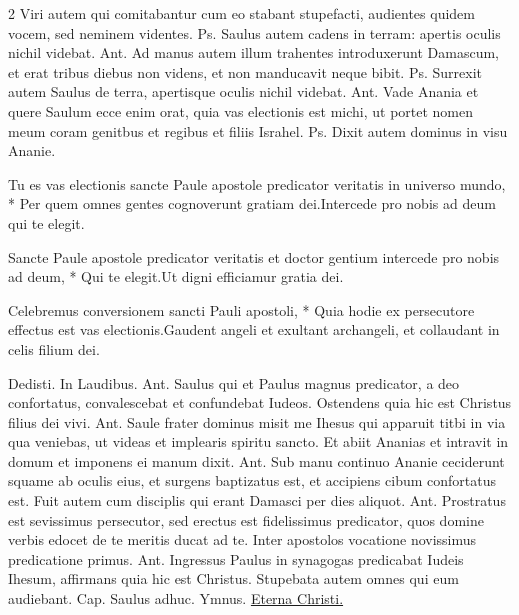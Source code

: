 \begin{multicols*}{2}
 Viri autem qui comitabantur cum eo stabant stupefacti, audientes quidem vocem, sed neminem videntes. {\color{Red} Ps.}  \V Saulus autem cadens in terram: apertis oculis nichil videbat. {\color{Red} Ant.} Ad manus autem illum trahentes introduxerunt Damascum, et erat tribus diebus non videns, et non manducavit neque bibit. {\color{Red} Ps.}  \V Surrexit autem Saulus de terra, apertisque oculis nichil videbat. {\color{Red} Ant.} Vade Anania et quere Saulum ecce enim orat, quia vas electionis est michi, ut portet nomen meum coram genitbus et regibus et filiis Israhel. {\color{Red} Ps.}  \V Dixit autem dominus in visu Ananie.
\begin{responsory}[tu-es-vas]
{Tu es vas electionis sancte Paule apostole predicator veritatis in universo mundo, * Per quem omnes gentes cognoverunt gratiam dei.}{Intercede pro nobis ad deum qui te elegit.}
\end{responsory}%
\begin{responsory}
{Sancte Paule apostole predicator veritatis et doctor gentium intercede pro nobis ad deum, * Qui te elegit.}{Ut digni efficiamur gratia dei.}
\end{responsory}%
\begin{responsory-doxology}
{Celebremus conversionem sancti Pauli apostoli, * Quia hodie ex persecutore effectus est vas electionis.}{Gaudent angeli et exultant archangeli, et collaudant in celis filium dei.}
\end{responsory-doxology}%
\newline \V Dedisti. {\color{Red} In Laudibus. Ant.} Saulus qui et Paulus magnus predicator, a deo confortatus, convalescebat et confundebat Iudeos. \V Ostendens quia hic est Christus filius dei vivi. {\color{Red} Ant.} Saule frater dominus misit me Ihesus qui apparuit titbi in via qua veniebas, ut videas et implearis spiritu sancto. \V Et abiit Ananias et intravit in domum et imponens ei manum dixit. {\color{Red} Ant.} Sub manu continuo Ananie ceciderunt squame ab oculis eius, et surgens baptizatus est, et accipiens cibum confortatus est. \V Fuit autem cum disciplis qui erant Damasci per dies aliquot. {\color{Red} Ant.} Prostratus est sevissimus persecutor, sed erectus est fidelissimus predicator, quos domine verbis edocet de te meritis ducat ad te. \V Inter apostolos vocatione novissimus predicatione primus. {\color{Red} Ant.} Ingressus Paulus in synagogas predicabat Iudeis Ihesum, affirmans quia hic est Christus. \V Stupebata autem omnes qui eum audiebant. {\color{Red} Cap.} Saulus adhuc. {\color{Red} Ymnus.} \hyperlink{eterna-christi-munera}{Eterna Christi.}

\end{multicols*}
